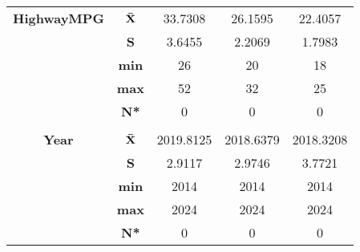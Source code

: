 \begin{center}
\begin{tabular}{|c|c||c|c|c|}
{\bf HighwayMPG} &  $\bf \bar{X}$ & 33.7308 & 26.1595 & 22.4057 \\
\cline{2-5}
 & {\bf  S} & 3.6455 & 2.2069 & 1.7983 \\
\cline{2-5}
 & {\bf  min} & 26 & 20 & 18 \\
\cline{2-5}
 & {\bf  max} & 52 & 32 & 25 \\
\cline{2-5}
 & {\bf  N*} & 0 & 0 & 0 \\
\cline{2-5}
\hline
\hline
 &  &  &  & \\  [-2.4ex]
{\bf Year} &  $\bf \bar{X}$ & 2019.8125 & 2018.6379 & 2018.3208 \\
\cline{2-5}
 & {\bf  S} & 2.9117 & 2.9746 & 3.7721 \\
\cline{2-5}
 & {\bf  min} & 2014 & 2014 & 2014 \\
\cline{2-5}
 & {\bf  max} & 2024 & 2024 & 2024 \\
\cline{2-5}
 & {\bf  N*} & 0 & 0 & 0 \\
\cline{2-5}
\hline
\hline
\end{tabular}
\end{center}

